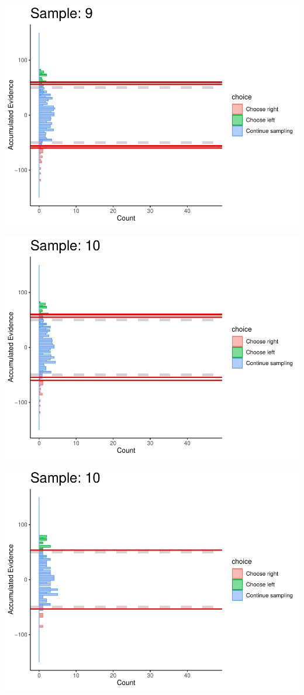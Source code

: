 \documentclass[
]{book}
\begin{document}
\begin{center}\includegraphics[width=0.8\linewidth]{LateNightBayes_files/figure-latex/fixed_dcb-88} \end{center}

\begin{center}\includegraphics[width=0.8\linewidth]{LateNightBayes_files/figure-latex/fixed_dcb-89} \end{center}

\begin{center}\includegraphics[width=0.8\linewidth]{LateNightBayes_files/figure-latex/fixed_dcb-90} \end{center}
\end{document}
